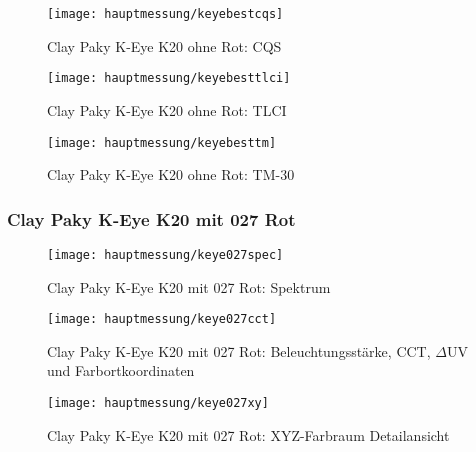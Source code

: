 \documentclass[pagesize,paper=A4,fontsize=12pt,utf8,numbers=noenddot,bibliography=totoc,listof=totoc,DIV=11,BCOR=1mm]{scrreprt}
\begin{document}
\begin{figure}[htp]     %
\centering
\texttt{[image: hauptmessung/keyebestcqs]} 
\caption {Clay Paky K-Eye K20 ohne Rot: CQS} 
\end{figure}

\begin{figure}[htp]     %
\centering
\texttt{[image: hauptmessung/keyebesttlci]} 
\caption {Clay Paky K-Eye K20 ohne Rot: TLCI} 
\end{figure}

\begin{figure}[htp]     %
\centering
\texttt{[image: hauptmessung/keyebesttm]} 
\caption {Clay Paky K-Eye K20 ohne Rot: TM-30} 
\end{figure}

\subsubsection{Clay Paky K-Eye K20 mit 027 Rot}

\begin{figure}[htp]     %
\centering
\texttt{[image: hauptmessung/keye027spec]} 
\caption {Clay Paky K-Eye K20 mit 027 Rot: Spektrum} 
\end{figure}

\begin{figure}[htp]     %
\centering
\texttt{[image: hauptmessung/keye027cct]} 
\caption {Clay Paky K-Eye K20 mit 027 Rot: Beleuchtungsstärke, CCT, $\Delta$UV und Farbortkoordinaten} 
\end{figure}

\begin{figure}[htp]     %
\centering
\texttt{[image: hauptmessung/keye027xy]} 
\caption {Clay Paky K-Eye K20 mit 027 Rot: XYZ-Farbraum Detailansicht} 
\end{figure}
\end{document}
